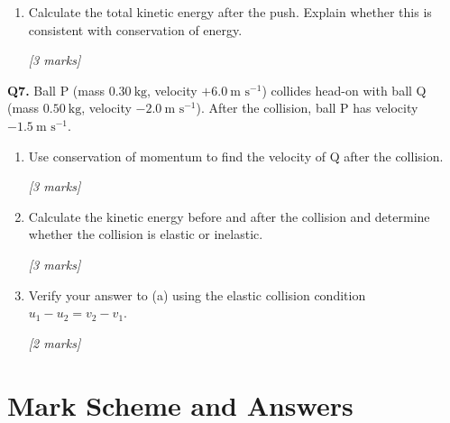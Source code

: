 \begin{tcolorbox}[colback=white, colframe=midblue, breakable]
\begin{enumerate}[label=(\alph*)]
  \item \begin{minipage}[t]{\linewidth}
  Calculate the total kinetic energy after the push. Explain whether this is consistent with conservation of energy.
  \par\hfill\textit{[3 marks]}
  \vspace{4cm}
  \end{minipage}
\end{enumerate}

\begin{minipage}{\linewidth}
\textbf{Q7.} Ball P (mass $0.30\ \text{kg}$, velocity $+6.0\ \text{m s}^{-1}$) collides head-on with ball Q (mass $0.50\ \text{kg}$, velocity $-2.0\ \text{m s}^{-1}$). After the collision, ball P has velocity $-1.5\ \text{m s}^{-1}$.

\begin{enumerate}[label=(\alph*)]
  \item Use conservation of momentum to find the velocity of Q after the collision.
  \par\hfill\textit{[3 marks]}
  \vspace{3.5cm}

  \item Calculate the kinetic energy before and after the collision and determine whether the collision is elastic or inelastic.
  \par\hfill\textit{[3 marks]}
  \vspace{4cm}

  \item Verify your answer to (a) using the elastic collision condition $u_1 - u_2 = v_2 - v_1$.
  \par\hfill\textit{[2 marks]}
  \vspace{3cm}
\end{enumerate}
\end{minipage}

\end{tcolorbox}


\pagebreak

\section{Mark Scheme and Answers}

